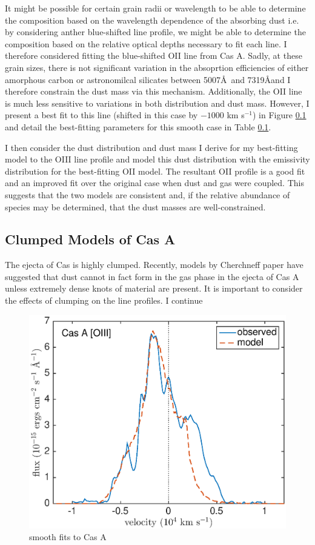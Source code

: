 It might be possible for certain grain radii or wavelength to be able to determine the composition based on the wavelength dependence of the absorbing dust i.e. by considering anther blue-shifted line profile, we might be able to determine the composition based on the relative optical depths necessary to fit each line.  I therefore considered fitting the blue-shifted OII line from Cas A.  Sadly, at these grain sizes, there is not significant variation in the absoprtion efficiencies of either amorphous carbon or astronomilcal silicates between 5007\AA\ and 7319\AA and I therefore constrain the dust mass via this mechanism.  Additionally, the OII line is much less sensitive to variations in both distribution and dust mass.  However, I present a best fit to this line (shifted in this case by $-1000$ km s$^{-1}$) in Figure \ref{}  and detail the best-fitting parameters for this smooth case in Table \ref{}. 

I then consider the dust distribution and dust mass I derive for my best-fitting model to the OIII line profile and model this dust distribution with the emissivity distribution for the best-fitting OII model.  The resultant OII profile is a good fit and an improved fit over the original case when dust and gas were coupled.  This suggests that the two models are consistent and, if the relative abundance of species may be determined, that the dust masses are well-constrained.

\subsection{Clumped Models of Cas A}

The ejecta of Cas is highly clumped.  Recently, models by {Cherchneff paper} have suggested that dust cannot in fact form in the gas phase in the ejecta of Cas A unless extremely dense knots of material are present.  It is important to consider the effects of clumping on the line profiles.  I continue


\begin{figure}
\centering
\includegraphics[scale=0.4,clip=true, trim=20 0 40 20]{chapters/chapter6/figs/CasA/CasA_OIII}
\caption{smooth fits to Cas A}
\label{CasA}
\end{figure}

